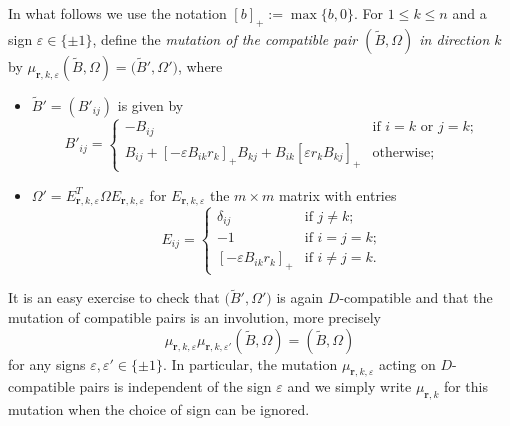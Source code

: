\documentclass{amsart}
\numberwithin{equation}{section}
\newcommand{\bfr}{{\boldsymbol{r}}}
\renewcommand{\max}{\operatorname{max}}
\begin{document}
In what follows we use the notation $[b]_+:=\max\{b,0\}$.
For $1\le k\le n$ and a sign $\varepsilon\in\{\pm1\}$, define the \emph{mutation of the compatible pair $(\tilde B,\Omega)$ in direction $k$} by $\mu_{\bfr,k,\varepsilon}(\tilde B,\Omega)=\big(\tilde B',\Omega'\big)$, where
\begin{itemize}
  \item $\tilde B'=(B'_{ij})$ is given by
    \begin{equation}
      \label{eq:matrix mutation}
      B'_{ij}=
      \begin{cases}
        -B_{ij} & \text{if $i=k$ or $j=k$;}\\ 
        B_{ij} + [-\varepsilon B_{ik}r_k]_+ B_{kj} + B_{ik} [\varepsilon r_kB_{kj}]_+ & \text{otherwise;}
      \end{cases}
    \end{equation}
  \item $\Omega'=E_{\bfr,k,\varepsilon}^T\Omega E_{\bfr,k,\varepsilon}$ for $E_{\bfr,k,\varepsilon}$ the $m\times m$ matrix with entries
    \[E_{ij}=\begin{cases}\delta_{ij} & \text{if $j\ne k$;}\\ -1 & \text{if $i=j=k$;}\\ [-\varepsilon B_{ik}r_k]_+ & \text{if $i\ne j=k$.}\end{cases}\]
\end{itemize}
It is an easy exercise to check that $\big(\tilde B',\Omega'\big)$ is again $D$-compatible and that the mutation of compatible pairs is an involution, more precisely 
\[\mu_{\bfr,k,\varepsilon}\mu_{\bfr,k,\varepsilon'}(\tilde B,\Omega)=(\tilde B,\Omega)\]
for any signs $\varepsilon,\varepsilon'\in\{\pm1\}$.
In particular, the mutation $\mu_{\bfr,k,\varepsilon}$ acting on $D$-compatible pairs is independent of the sign $\varepsilon$ and we simply write $\mu_{\bfr,k}$ for this mutation when the choice of sign can be ignored.
\end{document}
